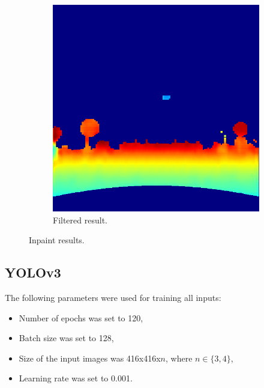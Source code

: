 \documentclass[twoside]{ctuthesis}
\theoremstyle{plain}
\theoremstyle{definition}
\theoremstyle{note}
\begin{document}
\begin{figure}[h]
\begin{subfigure}[b]{0.3\textwidth}
		\includegraphics[width=\textwidth]{inpaint.png}
		\caption{Filtered result.}
	\end{subfigure}
	\caption{Inpaint results.}
\end{figure}
\subsection{YOLOv3}
The following parameters were used for training all inputs:
\begin{itemize}
	\item Number of epochs was set to 120,
	\item Batch size was set to 128,
	\item Size of the input images was 416x416x$n$, where $n\in\{3,4\}$,
	\item Learning rate was set to 0.001.
\end{itemize}
\end{document}
